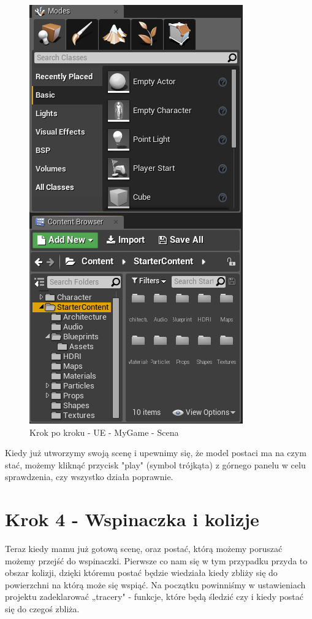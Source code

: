 \documentclass[12pt]{xmgr}
\begin{document}
\newpage
\begin{figure}[!htb]
    \begin{center}
    \includegraphics[scale=0.5]{Screeny/UeKrokPoKroku/UE-MyGame-Scene.png}
    \end{center}
    \caption{Krok po kroku - UE -  MyGame - Scena}
\end{figure}

Kiedy już utworzymy swoją scenę i upewnimy się, że model postaci ma na czym stać, możemy kliknąć przycisk "play" (symbol trójkąta) z górnego panelu w celu sprawdzenia, czy wszystko działa poprawnie.

\newpage
\section{Krok 4 - Wspinaczka i kolizje}

Teraz kiedy mamu już gotową scenę, oraz postać, którą możemy poruszać możemy przejść do wspinaczki. Pierwsze co nam się w tym przypadku przyda to obszar kolizji, dzięki któremu postać będzie wiedziała kiedy zbliży się do powierzchni na którą może się wspiąć. Na początku powinniśmy w ustawieniach projektu zadeklarować „tracery" - funkcje, które będą śledzić czy i kiedy postać się do czegoś zbliża.
\end{document}
